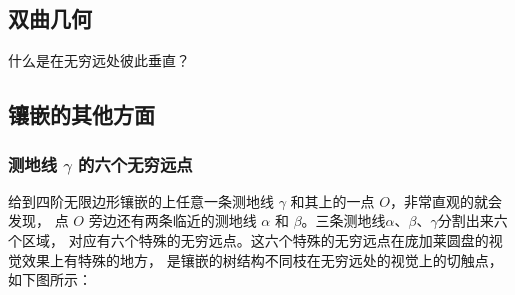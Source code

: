 \documentclass[a4paper,12pt]{article}
\begin{document}
\newpage

\subsection{双曲几何}

什么是在无穷远处彼此垂直？

\newpage

\subsection{镶嵌的其他方面}

\subsubsection{测地线 $\gamma$ 的六个无穷远点}

给到四阶无限边形镶嵌的上任意一条测地线 $\gamma$ 和其上的一点 $O$，非常直观的就会发现，
点 $O$ 旁边还有两条临近的测地线 $\alpha$ 和 $\beta$。三条测地线$\alpha$、$\beta$、$\gamma$分割出来六个区域，
对应有六个特殊的无穷远点。这六个特殊的无穷远点在庞加莱圆盘的视觉效果上有特殊的地方，
是镶嵌的树结构不同枝在无穷远处的视觉上的切触点，如下图所示：
\end{document}
